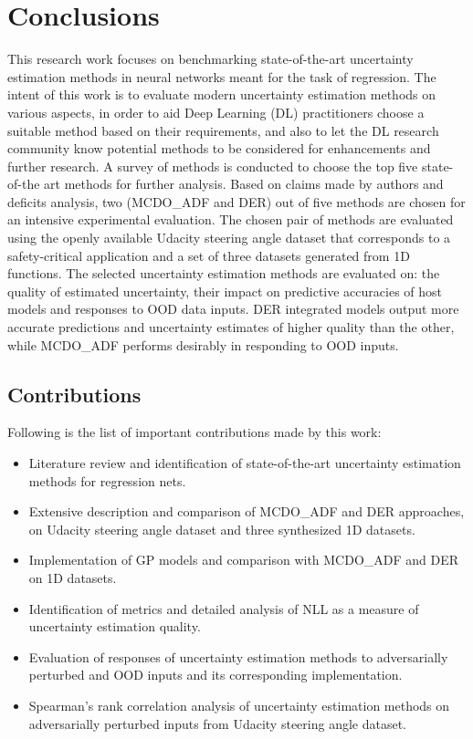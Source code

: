 

    \chapter{Conclusions}
	This research work focuses on benchmarking state-of-the-art uncertainty estimation methods in neural networks meant for the task of regression. The intent of this work is to evaluate modern uncertainty estimation methods on various aspects, in order to aid Deep Learning (DL) practitioners choose a suitable method based on their requirements, and also to let the DL research community know potential methods to be considered for enhancements and further research. A survey of methods is conducted to choose the top five state-of-the art methods for further analysis. Based on claims made by authors and deficits analysis, two (MCDO\_ADF and DER) out of five methods are chosen for an intensive experimental evaluation. The chosen pair of methods are evaluated using the openly available Udacity steering angle dataset that corresponds to a safety-critical application and a set of three datasets generated from 1D functions. The selected uncertainty estimation methods are evaluated on: the quality of estimated uncertainty, their impact on predictive accuracies of host models and responses to OOD data inputs. DER integrated models output more accurate predictions and uncertainty estimates of higher quality than the other, while MCDO\_ADF performs desirably in responding to OOD inputs.
	
    \section{Contributions}
	Following is the list of important contributions made by this work:
	\begin{itemize}
		\item Literature review and identification of state-of-the-art uncertainty estimation methods for regression nets.
		\item Extensive description and comparison of MCDO\_ADF and DER approaches, on Udacity steering angle dataset and three synthesized 1D datasets.
		\item Implementation of GP models and comparison with MCDO\_ADF and DER on 1D datasets.
		\item Identification of metrics and detailed analysis of NLL as a measure of uncertainty estimation quality.
		\item Evaluation of responses of uncertainty estimation methods to adversarially perturbed and OOD inputs and its corresponding implementation.
		\item Spearman's rank correlation analysis of uncertainty estimation methods on adversarially perturbed inputs from Udacity steering angle dataset.
	\end{itemize}

